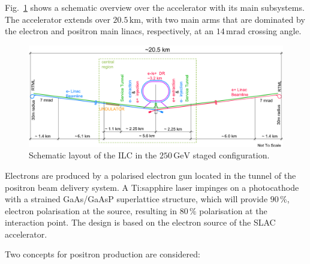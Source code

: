 \documentclass[%
 reprint,
 amsmath,amssymb,
 aps,
]{revtex4-1}
\def\Fig#1{Fig.~\ref{#1}}
\begin{document}
\Fig{fig_ilc-schematic} shows a schematic overview over the accelerator with its main subsystems.
The accelerator extends over $20.5\,{\mathrm{km}}$, with two main arms that are dominated by the electron and positron main linacs, respectively, at an $14\,{\mathrm{mrad}}$ crossing angle.

 \begin{figure}[tb]
 \begin{center}
 \includegraphics[width=\hsize]{figures/TDR-machine-layout-cartoon-staged.pdf}
\caption{Schematic layout of the ILC in the $250\,{\mathrm{GeV}}$ staged configuration.
\label{fig_ilc-schematic}}
 \end{center}
 \end{figure}

Electrons are produced by a polarised electron gun located in the tunnel of the positron beam delivery system. A Ti:sapphire laser impinges on a photocathode with a strained GaAs/GaAsP superlattice structure, which will provide  $90\,\%$, electron polarisation at the source, resulting in $80\,\%$ polarisation at the interaction point. The design is based on the electron source of the SLAC accelerator. 

Two concepts for positron production are considered:
\end{document}
